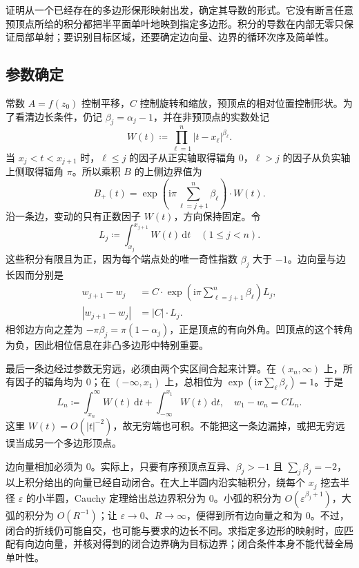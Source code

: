 证明从一个已经存在的多边形保形映射出发，确定其导数的形式。它没有断言任意预顶点所给的积分都把半平面单叶地映到指定多边形。积分的导数在内部无零只保证局部单射；要识别目标区域，还要确定边向量、边界的循环次序及简单性。

\subsection{参数确定}
\label{b3:subsec:070304}

常数 \(A=f(z_0)\) 控制平移，\(C\) 控制旋转和缩放，预顶点的相对位置控制形状。为了看清边长条件，仍记 \(\beta_j=\alpha_j-1\)，并在非预顶点的实数处记
\[
 W(t)\coloneqq\prod_{\ell=1}^n|t-x_\ell|^{\beta_\ell}.
\]
当 \(x_j<t<x_{j+1}\) 时，\(\ell\le j\) 的因子从正实轴取得辐角 \(0\)，\(\ell>j\) 的因子从负实轴上侧取得辐角 \(\pi\)。所以乘积 \(B\) 的上侧边界值为
\[
 B_+(t)=\exp\left(\mathrm{i}\pi\sum_{\ell=j+1}^n\beta_\ell\right)
 \cdot W(t).
\]
沿一条边，变动的只有正数因子 \(W(t)\)，方向保持固定。令
\[
 L_j\coloneqq\int_{x_j}^{x_{j+1}}W(t)\,\mathrm{d}t
 \quad(1\le j<n).
\]
这些积分有限且为正，因为每个端点处的唯一奇性指数 \(\beta_j\) 大于 \(-1\)。边向量与边长因而分别是
\[
 \begin{aligned}
 w_{j+1}-w_j
 &=C\cdot\exp\left(\mathrm{i}\pi\sum_{\ell=j+1}^n\beta_\ell\right)L_j,\\
 |w_{j+1}-w_j|&=|C|\cdot L_j.
 \end{aligned}
\]
相邻边方向之差为 \(-\pi\beta_j=\pi(1-\alpha_j)\)，正是顶点的有向外角。凹顶点的这个转角为负，因此相位信息在非凸多边形中特别重要。

\ProseParagraphBreak
最后一条边经过参数无穷远，必须由两个实区间合起来计算。在 \((x_n,\infty)\) 上，所有因子的辐角均为 \(0\)；在 \((-\infty,x_1)\) 上，总相位为 \(\exp(\mathrm{i}\pi\sum_\ell\beta_\ell)=1\)。于是
\[
 L_n\coloneqq\int_{x_n}^{\infty}W(t)\,\mathrm{d}t
 +\int_{-\infty}^{x_1}W(t)\,\mathrm{d}t,\quad
 w_1-w_n=C L_n.
\]
这里 \(W(t)=O(|t|^{-2})\)，故无穷端也可积。不能把这一条边漏掉，或把无穷远误当成另一个多边形顶点。

\ProseParagraphBreak
边向量相加必须为 \(0\)。实际上，只要有序预顶点互异、\(\beta_j>-1\) 且 \(\sum_j\beta_j=-2\)，以上积分给出的向量已经自动闭合。在大上半圆内沿实轴积分，绕每个 \(x_j\) 挖去半径 \(\varepsilon\) 的小半圆，Cauchy 定理给出总边界积分为 \(0\)。小弧的积分为 \(O(\varepsilon^{\beta_j+1})\)，大弧的积分为 \(O(R^{-1})\)；让 \(\varepsilon\rightarrow0\)、\(R\rightarrow\infty\)，便得到所有边向量之和为 \(0\)。不过，闭合的折线仍可能自交，也可能与要求的边长不同。求指定多边形的映射时，应匹配有向边向量，并核对得到的闭合边界确为目标边界；闭合条件本身不能代替全局单叶性。

